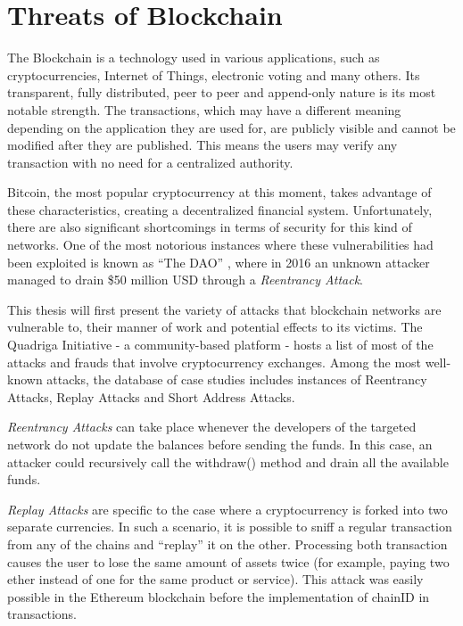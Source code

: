 \chapter{Threats of Blockchain}
The Blockchain \cite{blockchainAttacks} is a technology used in various applications, such as cryptocurrencies, Internet of Things, electronic voting and many others. Its transparent, fully distributed, peer to peer and append-only nature is its most notable strength. The transactions, which may have a different meaning depending on the application they are used for, are publicly visible and cannot be modified after they are published. This means the users may verify any transaction with no need for a centralized authority.

Bitcoin, the most popular cryptocurrency at this moment, takes advantage of these characteristics, creating a decentralized financial system. Unfortunately, there are also significant shortcomings in terms of security for this kind of networks. One of the most notorious instances where these vulnerabilities had been exploited is known as ``The DAO'' \cite{blockchainAttacks}, where in 2016 an unknown attacker managed to drain \$50 million USD through a \textit{Reentrancy Attack}.

This thesis will first present the variety of attacks that blockchain networks are vulnerable to, their manner of work and potential effects to its victims. The Quadriga Initiative \cite{quadriga}  - a community-based platform - hosts a list of most of the attacks and frauds that involve cryptocurrency exchanges. Among the most well-known attacks, the database of case studies includes instances of Reentrancy Attacks, Replay Attacks and Short Address Attacks.

\textit{Reentrancy Attacks} \cite{reentrancy} can take place whenever the developers of the targeted network do not update the balances before sending the funds. In this case, an attacker could recursively call the withdraw() method and drain all the available funds. 

\textit{Replay Attacks} \cite{replay} are specific to the case where a cryptocurrency is forked into two separate currencies. In such a scenario, it is possible to sniff a regular transaction from any of the chains and “replay” it on the other. Processing both transaction causes the user to lose the same amount of assets twice (for example, paying two ether instead of one for the same product or service). This attack was easily possible in the Ethereum blockchain before the implementation of chainID in transactions.

